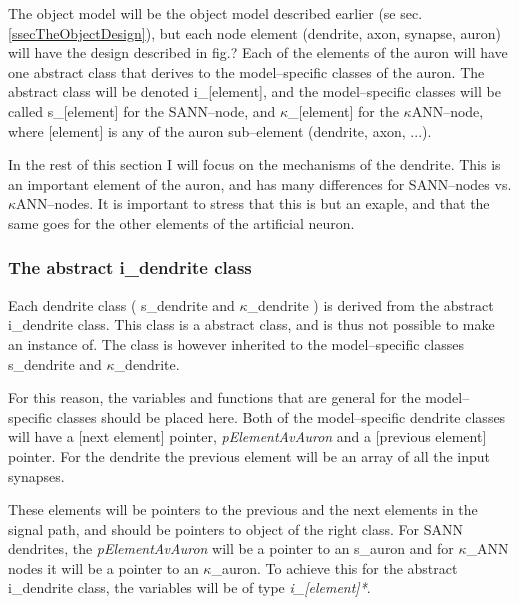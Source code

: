 	The object model will be the object model described earlier (se sec. \ref{ssecTheObjectDesign}), but each node element (dendrite, axon, synapse, auron) will have the design %
		described in fig.? %
	Each of the elements of the auron will have one abstract class that derives to the model--specific classes of the auron. 
	The abstract class will be denoted i\_[element], and the model--specific classes will be called s\_[element] for the SANN--node, and $\kappa$\_[element] for the $\kappa$ANN--node, 
		where [element] is any of the auron sub--element (dendrite, axon, ...).

	In the rest of this section I will focus on the mechanisms of the dendrite. This is an important element of the auron, and has many differences for SANN--nodes vs. $\kappa$ANN--nodes. 
	It is important to stress that this is but an exaple, and that the %
		same goes for the other elements of the artificial neuron.

	\subsubsection{The abstract i\_dendrite class}
	Each dendrite class ( s\_dendrite and $\kappa$\_dendrite ) is derived from the abstract i\_dendrite class.
	This class is a abstract class, and is thus not possible to make an instance of. The class is however inherited to the model--specific classes s\_dendrite and $\kappa$\_dendrite.

	For this reason, the variables and functions that are general for the model--specific classes should be placed here. 
	Both of the model--specific dendrite classes will have a [next element] pointer, \emph{pElementAvAuron} and a [previous element] pointer. For the dendrite the previous element will be an array of all the input synapses.

	These elements will be pointers to the previous and the next elements in the signal path, and should be pointers to object of the right class. 
	For SANN dendrites, the \emph{pElementAvAuron} will be a pointer to an s\_auron and for $\kappa$\_ANN nodes it will be a pointer to an $\kappa$\_auron. 
	To achieve this for the abstract i\_dendrite class, the variables will be of type \emph{i\_[element]*}. %

